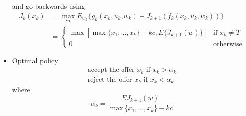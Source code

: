 \documentclass{article}
\begin{document}
\begin{itemize}
            and go backwards using
            \begin{equation*}
                \begin{split}
                    J_k(x_k) &= \max_{u_k}E_{w_k}\{g_k(x_k,u_k,w_k)+J_{k+1}(f_k(x_k,u_k,w_k))\}\\
                    &=\begin{cases}
                        \max[\max\{x_1,\dots,x_k\}-kc, E\{J_{k+1}(w)\}] & \text{if $x_k\neq T$}\\
                        0 & \text{otherwise}
                    \end{cases}
                \end{split}
            \end{equation*}
        \item Optimal policy
            \begin{equation*}
                \begin{aligned}
                    \text{accept the offer $x_k$ if $x_k>\alpha_k$}\\
                    \text{reject the offer $x_k$ if $x_k<\alpha_k$}
                \end{aligned}
            \end{equation*}
            where
            \begin{equation*}
                \alpha_k=\frac{E{J_{k+1}(w)}}{\max\{x_1,\dots,x_k\}-kc}
            \end{equation*}
    \end{itemize}
\end{document}
